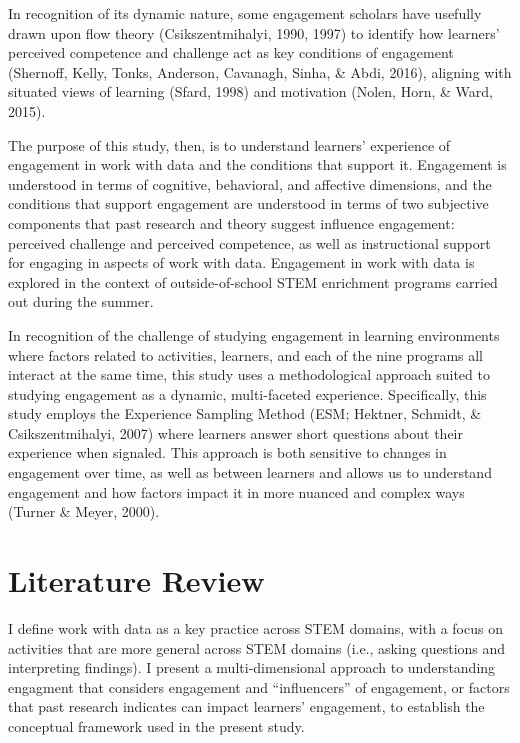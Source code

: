 \documentclass[]{book}
\theoremstyle{definition}
\theoremstyle{definition}
\theoremstyle{definition}
\theoremstyle{remark}
\begin{document}
In recognition of its dynamic nature, some engagement scholars have
usefully drawn upon flow theory (Csikszentmihalyi, 1990, 1997) to
identify how learners' perceived competence and challenge act as key
conditions of engagement (Shernoff, Kelly, Tonks, Anderson, Cavanagh,
Sinha, \& Abdi, 2016), aligning with situated views of learning (Sfard,
1998) and motivation (Nolen, Horn, \& Ward, 2015).

The purpose of this study, then, is to understand learners' experience
of engagement in work with data and the conditions that support it.
Engagement is understood in terms of cognitive, behavioral, and
affective dimensions, and the conditions that support engagement are
understood in terms of two subjective components that past research and
theory suggest influence engagement: perceived challenge and perceived
competence, as well as instructional support for engaging in aspects of
work with data. Engagement in work with data is explored in the context
of outside-of-school STEM enrichment programs carried out during the
summer.

In recognition of the challenge of studying engagement in learning
environments where factors related to activities, learners, and each of
the nine programs all interact at the same time, this study uses a
methodological approach suited to studying engagement as a dynamic,
multi-faceted experience. Specifically, this study employs the
Experience Sampling Method (ESM; Hektner, Schmidt, \& Csikszentmihalyi,
2007) where learners answer short questions about their experience when
signaled. This approach is both sensitive to changes in engagement over
time, as well as between learners and allows us to understand engagement
and how factors impact it in more nuanced and complex ways (Turner \&
Meyer, 2000).

\chapter{Literature Review}\label{literature-review}

I define work with data as a key practice across STEM domains, with a
focus on activities that are more general across STEM domains (i.e.,
asking questions and interpreting findings). I present a
multi-dimensional approach to understanding engagment that considers
engagement and ``influencers'' of engagement, or factors that past
research indicates can impact learners' engagement, to establish the
conceptual framework used in the present study.
\end{document}
